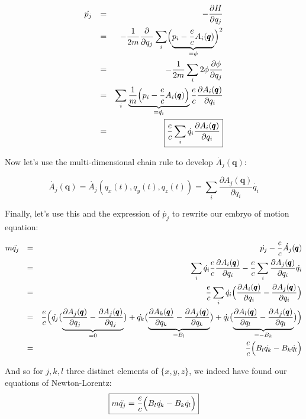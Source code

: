 \documentclass[solutions.tex]{subfiles}
\begin{document}
\begin{equation*}\begin{aligned}
	\dot{p_j} &&=&& -\frac{\partial H}{\partial q_j} \\
	~ &&=&& -\frac{1}{2m}\frac{\partial }{\partial q_j}
		\sum_i\Bigl(\underbrace{p_i - \frac{e}cA_i(\pmb{q})}_{=\phi}\Bigr)^2 \\
	~ &&=&& -\frac{1}{2m}\sum_i 2\phi\frac{\partial \phi}{\partial q_j} \\
	~ &&=&& \sum_i \underbrace{\frac1m\Bigl(p_i - \frac{e}cA_i(\pmb{q})\Bigl)}_{=\dot{q_i}}
		\frac{e}c\frac{\partial A_i(\pmb{q})}{\partial q_i} \\
	~ &&=&& \boxed{\frac{e}c\sum_i\dot{q_i}\frac{\partial A_i(\pmb{q})}{\partial q_i}}
\end{aligned}\end{equation*}

Now let's use the multi-dimensional chain rule to develop $\dot{A_j}(\bm{q})$:

\[
	\dot{A_j}(\bm{q}) = \dot{A_j}(q_x(t), q_y(t), q_z(t))
		= \sum_i\frac{\partial A_j(\bm{q})}{\partial q_i}\dot{q_i}
\]

Finally, let's use this and the expression of $\dot{p_j}$ to rewrite our
embryo of motion equation:

\begin{equation*}\begin{aligned}
	m\ddot{q_j} &&=&& \dot{p_j} -\frac{e}c\dot{A_j}(\pmb{q}) \\
	~ &&=&& \sum_i\dot{q_i}
		\frac{e}c\frac{\partial A_i(\pmb{q})}{\partial q_i}
		-\frac{e}c\sum_i\frac{\partial A_j(\pmb{q})}{\partial q_i}\dot{q_i} \\
	~ &&=&& \frac{e}c\sum_i\dot{q_i}\Bigl(
		\frac{\partial A_i(\pmb{q})}{\partial q_i}
		-\frac{\partial A_j(\pmb{q})}{\partial q_i}\Bigr) \\
	~ &&=&& \frac{e}c\Bigl(\dot{q_j}\bigl(\underbrace{
		\frac{\partial A_j(\pmb{q})}{\partial q_j}
		-\frac{\partial A_j(\pmb{q})}{\partial q_j}
	}_{=0}\bigr)
		+\dot{q_k}\bigl(\underbrace{
		\frac{\partial A_k(\pmb{q})}{\partial q_k}
		-\frac{\partial A_j(\pmb{q})}{\partial q_k}
	}_{=B_l}\bigr)
		+\dot{q_l}\bigl(\underbrace{
		\frac{\partial A_l(\pmb{q})}{\partial q_l}
		-\frac{\partial A_j(\pmb{q})}{\partial q_l}
	}_{=-B_k}\bigr)
	\Bigr) \\
	~ &&=&& \frac{e}c\Bigl(B_l\dot{q_k}-B_k\dot{q_l}\Bigr)
\end{aligned}\end{equation*}

And so for $j, k, l$ three distinct elements of $\{x, y, z\}$, we
indeed have found our equations of Newton-Lorentz:
\[
	\boxed{m\ddot{q_j} = \frac{e}c\Bigl(B_l\dot{q_k}-B_k\dot{q_l}\Bigr)}
\]
\end{document}
